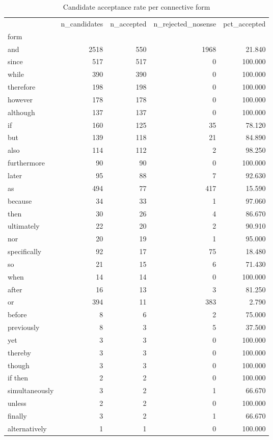 \begin{table}
\caption{Candidate acceptance rate per connective form}
\begin{tabular}{lrrrr}
\toprule
 & n\_candidates & n\_accepted & n\_rejected\_nosense & pct\_accepted \\
form &  &  &  &  \\
\midrule
and & 2518 & 550 & 1968 & 21.840 \\
since & 517 & 517 & 0 & 100.000 \\
while & 390 & 390 & 0 & 100.000 \\
therefore & 198 & 198 & 0 & 100.000 \\
however & 178 & 178 & 0 & 100.000 \\
although & 137 & 137 & 0 & 100.000 \\
if & 160 & 125 & 35 & 78.120 \\
but & 139 & 118 & 21 & 84.890 \\
also & 114 & 112 & 2 & 98.250 \\
furthermore & 90 & 90 & 0 & 100.000 \\
later & 95 & 88 & 7 & 92.630 \\
as & 494 & 77 & 417 & 15.590 \\
because & 34 & 33 & 1 & 97.060 \\
then & 30 & 26 & 4 & 86.670 \\
ultimately & 22 & 20 & 2 & 90.910 \\
nor & 20 & 19 & 1 & 95.000 \\
specifically & 92 & 17 & 75 & 18.480 \\
so & 21 & 15 & 6 & 71.430 \\
when & 14 & 14 & 0 & 100.000 \\
after & 16 & 13 & 3 & 81.250 \\
or & 394 & 11 & 383 & 2.790 \\
before & 8 & 6 & 2 & 75.000 \\
previously & 8 & 3 & 5 & 37.500 \\
yet & 3 & 3 & 0 & 100.000 \\
thereby & 3 & 3 & 0 & 100.000 \\
though & 3 & 3 & 0 & 100.000 \\
if then & 2 & 2 & 0 & 100.000 \\
simultaneously & 3 & 2 & 1 & 66.670 \\
unless & 2 & 2 & 0 & 100.000 \\
finally & 3 & 2 & 1 & 66.670 \\
alternatively & 1 & 1 & 0 & 100.000 \\

\end{tabular}
\end{table}
